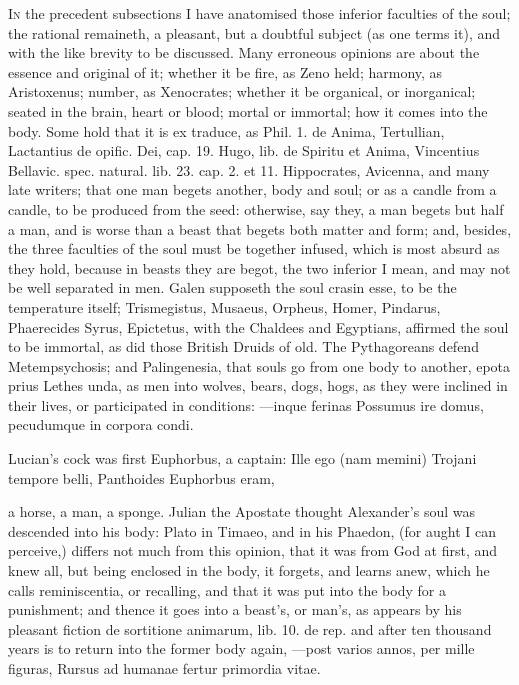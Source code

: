 {\lettrine{I}{n} the precedent subsections I have anatomised those inferior faculties
of the soul; the rational remaineth, a pleasant, but a doubtful subject
(as one terms it), and with the like brevity to be discussed. Many
erroneous opinions are about the essence and original of it; whether it
be fire, as Zeno held; harmony, as Aristoxenus; number, as Xenocrates;
whether it be organical, or inorganical; seated in the brain, heart or
blood; mortal or immortal; how it comes into the body. Some hold that
it is ex traduce, as Phil. 1. de Anima, Tertullian, Lactantius de
opific. Dei, cap. 19. Hugo, lib. de Spiritu et Anima, Vincentius
Bellavic. spec. natural. lib. 23. cap. 2. et 11. Hippocrates, Avicenna,
and many  late writers; that one man begets another, body and
soul; or as a candle from a candle, to be produced from the seed:
otherwise, say they, a man begets but half a man, and is worse than a
beast that begets both matter and form; and, besides, the three
faculties of the soul must be together infused, which is most absurd as
they hold, because in beasts they are begot, the two inferior I mean,
and may not be well separated in men.  Galen supposeth the soul
crasin esse, to be the temperature itself; Trismegistus, Musaeus,
Orpheus, Homer, Pindarus, Phaerecides Syrus, Epictetus, with the
Chaldees and Egyptians, affirmed the soul to be immortal, as did those
British Druids of old. The Pythagoreans defend
Metempsychosis; and Palingenesia, that souls go from one body to
another, epota prius Lethes unda, as men into wolves, bears, dogs,
hogs, as they were inclined in their lives, or participated in
conditions:
---inque ferinas
Possumus ire domus, pecudumque in corpora condi.

Lucian's cock was first Euphorbus, a captain:
Ille ego (nam memini) Trojani tempore belli,
Panthoides Euphorbus eram,

a horse, a man, a sponge. Julian the Apostate thought Alexander's
soul was descended into his body: Plato in Timaeo, and in his Phaedon,
(for aught I can perceive,) differs not much from this opinion, that it
was from God at first, and knew all, but being enclosed in the body, it
forgets, and learns anew, which he calls reminiscentia, or recalling,
and that it was put into the body for a punishment; and thence it goes
into a beast's, or man's, as appears by his pleasant fiction de
sortitione animarum, lib. 10. de rep. and after ten thousand
years is to return into the former body again,
---post varios annos, per mille figuras,
Rursus ad humanae fertur primordia vitae.

}
